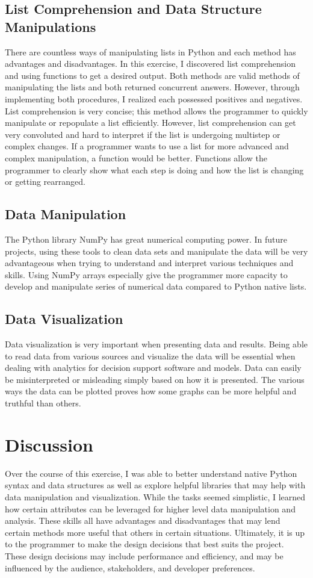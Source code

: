 \documentclass[journal]{IEEEtran}
\begin{document}
\subsection{List Comprehension and Data Structure Manipulations}
There are countless ways of manipulating lists in Python and each method has advantages and disadvantages. In this exercise, I discovered list comprehension and using functions to get a desired output. Both methods are valid methods of manipulating the lists and both returned concurrent answers. However, through implementing both procedures, I realized each possessed positives and negatives. List comprehension is very concise; this method allows the programmer to quickly manipulate or repopulate a list efficiently. However, list comprehension can get very convoluted and hard to interpret if the list is undergoing multistep or complex changes. If a programmer wants to use a list for more advanced and complex manipulation, a function would be better. Functions allow the programmer to clearly show what each step is doing and how the list is changing or getting rearranged. 

\subsection{Data Manipulation}
The Python library NumPy has great numerical computing power. In future projects, using these tools to clean data sets and manipulate the data will be very advantageous when trying to understand and interpret various techniques and skills. Using NumPy arrays especially give the programmer more capacity to develop and manipulate series of numerical data compared to Python native lists. 

\subsection{Data Visualization}
Data visualization is very important when presenting data and results. Being able to read data from various sources and visualize the data will be essential when dealing with analytics for decision support software and models. Data can easily be misinterpreted or misleading simply based on how it is presented. The various ways the data can be plotted proves how some graphs can be more helpful and truthful than others. 

\section{Discussion}
Over the course of this exercise, I was able to better understand native Python syntax and data structures as well as explore helpful libraries that may help with data manipulation and visualization. While the tasks seemed simplistic, I learned how certain attributes can be leveraged for higher level data manipulation and analysis. These skills all have advantages and disadvantages that may lend certain methods more useful that others in certain situations. Ultimately, it is up to the programmer to make the design decisions that best suits the project. These design decisions may include performance and efficiency, and may be influenced by the audience, stakeholders, and developer preferences. 
\end{document}

